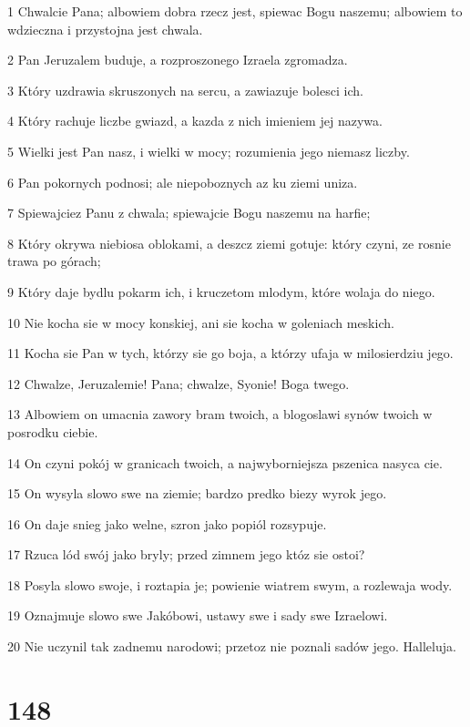 \par 1 Chwalcie Pana; albowiem dobra rzecz jest, spiewac Bogu naszemu; albowiem to wdzieczna i przystojna jest chwala.
\par 2 Pan Jeruzalem buduje, a rozproszonego Izraela zgromadza.
\par 3 Który uzdrawia skruszonych na sercu, a zawiazuje bolesci ich.
\par 4 Który rachuje liczbe gwiazd, a kazda z nich imieniem jej nazywa.
\par 5 Wielki jest Pan nasz, i wielki w mocy; rozumienia jego niemasz liczby.
\par 6 Pan pokornych podnosi; ale niepoboznych az ku ziemi uniza.
\par 7 Spiewajciez Panu z chwala; spiewajcie Bogu naszemu na harfie;
\par 8 Który okrywa niebiosa oblokami, a deszcz ziemi gotuje: który czyni, ze rosnie trawa po górach;
\par 9 Który daje bydlu pokarm ich, i kruczetom mlodym, które wolaja do niego.
\par 10 Nie kocha sie w mocy konskiej, ani sie kocha w goleniach meskich.
\par 11 Kocha sie Pan w tych, którzy sie go boja, a którzy ufaja w milosierdziu jego.
\par 12 Chwalze, Jeruzalemie! Pana; chwalze, Syonie! Boga twego.
\par 13 Albowiem on umacnia zawory bram twoich, a blogoslawi synów twoich w posrodku ciebie.
\par 14 On czyni pokój w granicach twoich, a najwyborniejsza pszenica nasyca cie.
\par 15 On wysyla slowo swe na ziemie; bardzo predko biezy wyrok jego.
\par 16 On daje snieg jako welne, szron jako popiól rozsypuje.
\par 17 Rzuca lód swój jako bryly; przed zimnem jego któz sie ostoi?
\par 18 Posyla slowo swoje, i roztapia je; powienie wiatrem swym, a rozlewaja wody.
\par 19 Oznajmuje slowo swe Jakóbowi, ustawy swe i sady swe Izraelowi.
\par 20 Nie uczynil tak zadnemu narodowi; przetoz nie poznali sadów jego. Halleluja.

\chapter{148}

